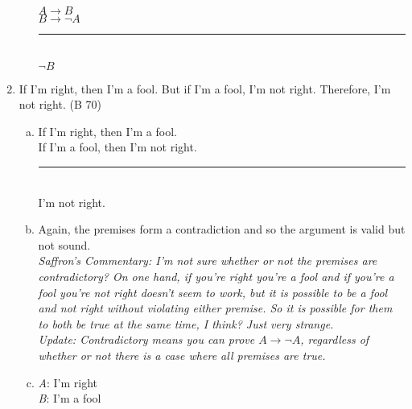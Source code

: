 \documentclass{article}
\begin{document}
\begin{enumerate}
\begin{enumerate}[(a)]
                        $A \to B$\\
                        $B \to \neg A$\\
                        \rule{5em}{.5pt}\\
                        $\neg B$
            \end{enumerate}
      \item If I'm right, then I'm a fool. But if I'm a fool, I'm not right. Therefore, I'm not right. (B 70)
            \begin{enumerate}[(a)]
                  \item If I'm right, then I'm a fool.\\
                        If I'm a fool, then I'm not right.\\
                        \rule{15em}{.5pt}\\
                        I'm not right.
                  \item Again, the premises form a contradiction and so the argument is valid but not sound.\\
                        \textit{Saffron's Commentary: I'm not sure whether or not the premises are contradictory? On one hand, if you're right you're a fool and if you're a fool you're not right doesn't seem to work, but it is possible to be a fool and not right without violating either premise. So it is possible for them to both be true at the same time, I think? Just very strange.\\
                              Update: Contradictory means you can prove $A \to \neg A$, regardless of whether or not there is a case where all premises are true.}
                  \item \textit{A}: I'm right\\
                        \textit{B}: I'm a fool\\


\end{enumerate}
\end{enumerate}
\end{document}
